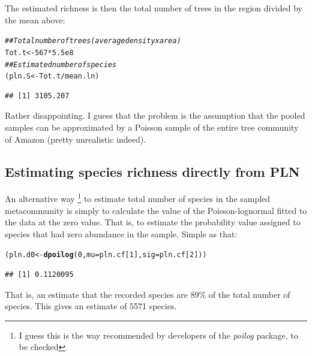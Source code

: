 \documentclass[12pt, A4]{article}\usepackage[]{graphicx}\usepackage[]{color}
\makeatletter
\newcommand{\hlnum}[1]{\textcolor[rgb]{0.686,0.059,0.569}{#1}}%
\newcommand{\hlcom}[1]{\textcolor[rgb]{0.678,0.584,0.686}{\textit{#1}}}%
\newcommand{\hlopt}[1]{\textcolor[rgb]{0,0,0}{#1}}%
\newcommand{\hlstd}[1]{\textcolor[rgb]{0.345,0.345,0.345}{#1}}%
\newcommand{\hlkwb}[1]{\textcolor[rgb]{0.69,0.353,0.396}{#1}}%
\newcommand{\hlkwc}[1]{\textcolor[rgb]{0.333,0.667,0.333}{#1}}%
\newcommand{\hlkwd}[1]{\textcolor[rgb]{0.737,0.353,0.396}{\textbf{#1}}}%
\newenvironment{kframe}{%
 \def\at@end@of@kframe{}%
 \ifinner\ifhmode%
  \def\at@end@of@kframe{\end{minipage}}%
  \begin{minipage}{\columnwidth}%
 \fi\fi%
 \def\FrameCommand##1{\hskip\@totalleftmargin \hskip-\fboxsep
 \colorbox{shadecolor}{##1}\hskip-\fboxsep
     \hskip-\linewidth \hskip-\@totalleftmargin \hskip\columnwidth}%
 \MakeFramed {\advance\hsize-\width
   \@totalleftmargin\z@ \linewidth\hsize
   \@setminipage}}%
 {\par\unskip\endMakeFramed%
 \at@end@of@kframe}
\newenvironment{knitrout}{}{} %
\makeatother
\begin{document}
The estimated richness is then the total number of trees in the region
divided by the mean above: 

 
\begin{knitrout}
\color{fgcolor}\begin{kframe}
\begin{alltt}
\hlcom{## Total number of trees (average density x area)}
\hlstd{Tot.t} \hlkwb{<-} \hlnum{567}\hlopt{*}\hlnum{5.5e8}
\hlcom{## Estimated number of species}
\hlstd{(pln.S} \hlkwb{<-} \hlstd{Tot.t}\hlopt{/}\hlstd{mean.ln)}
\end{alltt}
\begin{verbatim}
## [1] 3105.207
\end{verbatim}
\end{kframe}
\end{knitrout}

Rather disappointing. I guess that the problem is the assumption that the pooled samples
can be approximated by a Poisson sample of the entire tree community of Amazon (pretty unrealistic indeed).


\subsection*{Estimating species richness directly from PLN}

An alternative way \footnote{I guess this is the way recommended by developers of the \emph{poilog} package, to be checked} 
to estimate total number of species in the sampled metacommunity
is simply to calculate the value of the Poisson-lognormal fitted to the data at
the zero value. That is, to estimate the probability value assigned to species that
had zero abundance in the sample. Simple as that:

\begin{knitrout}
\color{fgcolor}\begin{kframe}
\begin{alltt}
\hlstd{(pln.d0} \hlkwb{<-} \hlkwd{dpoilog}\hlstd{(}\hlnum{0}\hlstd{,} \hlkwc{mu} \hlstd{= pln.cf[}\hlnum{1}\hlstd{],} \hlkwc{sig}\hlstd{=pln.cf[}\hlnum{2}\hlstd{]))}
\end{alltt}
\begin{verbatim}
## [1] 0.1120095
\end{verbatim}
\end{kframe}
\end{knitrout}

That is, an estimate that the recorded species are 89\%
of the total number of species.
This gives an estimate of 5571 species.
\end{document}
